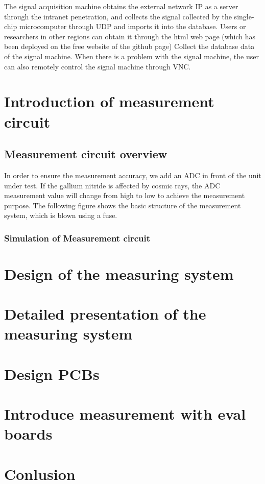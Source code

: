 The signal acquisition machine obtains the external network IP as a server through the intranet penetration, and collects the signal collected by the single-chip microcomputer through UDP and imports it into the database. Users or researchers in other regions can obtain it through the html web page (which has been deployed on the free website of the github page) Collect the database data of the signal machine. When there is a problem with the signal machine, the user can also remotely control the signal machine through VNC.

 
\chapter{Introduction of measurement circuit}
\label{chap:Introduction of measurement circuit}


\section{Measurement circuit overview}
\label{sec:Measurement circuit overview}
In order to ensure the measurement accuracy, we add an ADC in front of the unit under test. If the gallium nitride is affected by cosmic rays, the ADC measurement value will change from high to low to achieve the measurement purpose. The following figure shows the basic structure of the measurement system, which is blown using a fuse.

\subsection{Simulation of Measurement circuit}
\label{sec:Simulation of Measurement circuit}

\section{ }
\label{sec: }

\chapter{Design of the measuring system}
\label{chap:Design of the measuring system}

\chapter{Detailed presentation of the measuring system}
\label{chap:Detailed presentation of the measuring system}
 


\chapter{Design PCBs}
\label{chap:Design PCBs}

\chapter{Introduce measurement with eval boards }
\label{chap:Introduce measurement with eval boards }
 

\chapter{Conlusion}
\label{chap:Conlusion}
 
